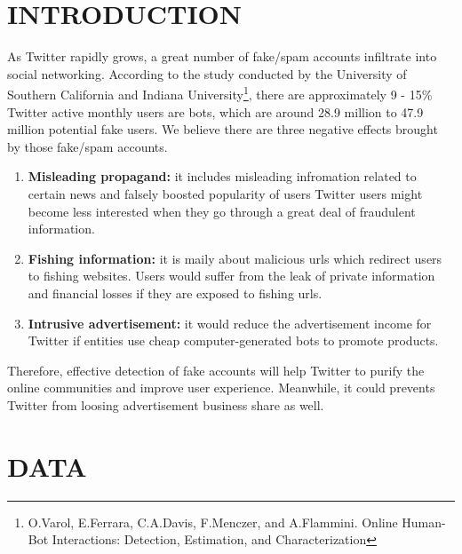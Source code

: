 \documentclass[a4paper, 12pt]{report}
\begin{document}
\section*{INTRODUCTION}
As Twitter rapidly grows, a great number of fake/spam accounts infiltrate into social networking. According to the study conducted by the University of Southern California and Indiana University\footnote{O.Varol, E.Ferrara, C.A.Davis, F.Menczer, and A.Flammini. Online Human-Bot Interactions: Detection, Estimation, and Characterization}, there are approximately 9 - 15\% Twitter active monthly users are bots, which are around 28.9 million to 47.9 million potential fake users. We believe there are three negative effects brought by those fake/spam accounts.
\begin{enumerate}
	\item \textbf{Misleading propagand:} it includes misleading infromation related to certain news and falsely boosted popularity of users  Twitter users might become less interested when they go through a great deal of fraudulent information.
	\item \textbf{Fishing information:} it is maily about malicious urls which redirect users to fishing websites. Users would suffer from the leak of private information and financial losses if they are exposed to fishing urls.
	\item \textbf{Intrusive advertisement:} it would reduce the advertisement income for Twitter if entities use cheap computer-generated bots to promote products.
\end{enumerate}
Therefore, effective detection of fake accounts will help Twitter to purify the online communities and improve user experience. Meanwhile, it could prevents Twitter from loosing advertisement business share as well.

\section*{DATA}
\end{document}
